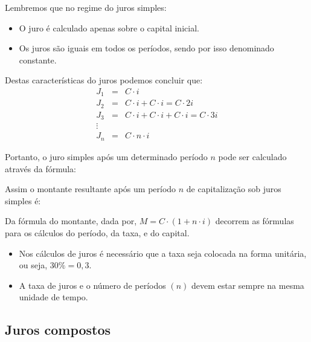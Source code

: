 Lembremos que no regime do juros simples:
 \begin{itemize}
  \item O juro é calculado apenas sobre o capital inicial.
  \item Os juros são iguais em todos os períodos, sendo por isso denominado constante.
 \end{itemize}

 Destas características do juros podemos concluir que:
  \begin{eqnarray*}
  J_1&=& C\cdot i \\
  J_2&=& C\cdot i + C\cdot i= C\cdot 2i \\
  J_3&=& C\cdot i + C\cdot i + C\cdot i= C\cdot 3i \\
  \vdots \\
  J_n&=& C \cdot n \cdot i
  \end{eqnarray*}

 Portanto, o juro simples após um determinado período $n$ pode ser calculado através da fórmula:
 

 Assim o montante resultante após um período $n$ de capitalização sob juros simples é:
 

 Da fórmula do montante, dada por, $M= C \cdot (1 + n \cdot i)$ decorrem as fórmulas para os cálculos do período, da taxa, e do capital.
 \begin{obs}
 \begin{itemize}
  \item Nos cálculos de juros é necessário que a taxa seja colocada na forma unitária, ou seja, $30 \%= 0,3$.
  \item A taxa de juros e o número de períodos $(n)$ devem estar sempre na mesma unidade de tempo.
 \end{itemize}
 \end{obs}



 \subsection{Juros compostos}


